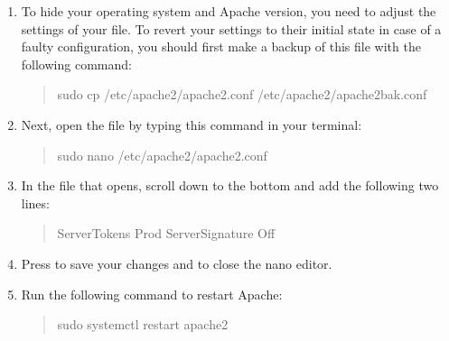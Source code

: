 \documentclass[a4paper,10pt,english,openany,oneside]{sphinxmanual}
\begin{document}
\begin{enumerate}
%
\item {} 
\sphinxAtStartPar
To hide your operating system and Apache version, you need to adjust the settings of your  file. To revert your settings to their initial state in case of a faulty configuration, you should first make a backup of this file with the following command:
\begin{quote}

\begin{sphinxVerbatim}[commandchars=\\\{\}]
\PYGZdl{} sudo cp /etc/apache2/apache2.conf /etc/apache2/apache2\PYGZus{}bak.conf
\end{sphinxVerbatim}
\end{quote}

\item {} 
\sphinxAtStartPar
Next, open the  file by typing this command in your terminal:
\begin{quote}

\begin{sphinxVerbatim}[commandchars=\\\{\}]
\PYGZdl{} sudo nano /etc/apache2/apache2.conf
\end{sphinxVerbatim}
\end{quote}

\item {} 
\sphinxAtStartPar
In the file that opens, scroll down to the bottom and add the following two lines:
\begin{quote}

\begin{sphinxVerbatim}[commandchars=\\\{\}]
ServerTokens Prod
ServerSignature Off
\end{sphinxVerbatim}
\end{quote}

\item {} 
\sphinxAtStartPar
Press  to save your changes and  to close the nano editor.

\item {} 
\sphinxAtStartPar
Run the following command to restart Apache:
\begin{quote}

\begin{sphinxVerbatim}[commandchars=\\\{\}]
\PYGZdl{} sudo systemctl restart apache2
\end{sphinxVerbatim}
\end{quote}


\end{enumerate}
\end{document}
